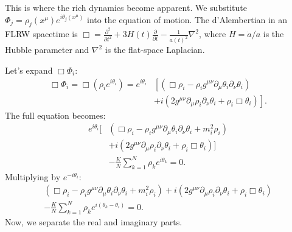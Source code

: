 This is where the rich dynamics become apparent. We substitute $\Phi_j = \rho_j(x^\mu) e^{i\theta_j(x^\mu)}$ into the equation of motion. The d'Alembertian in an FLRW spacetime is $\Box = \frac{\partial^2}{\partial t^2} + 3H(t) \frac{\partial}{\partial t} - \frac{1}{a(t)^2}\nabla^2$, where $H = \dot{a}/a$ is the Hubble parameter and $\nabla^2$ is the flat-space Laplacian.

Let's expand $\Box \Phi_i$:
\begin{equation}
    \begin{aligned}
        \Box \Phi_i = \Box (\rho_i e^{i\theta_i})
        = e^{i\theta_i} &\left[ (\Box \rho_i - \rho_i g^{\mu\nu}\partial_\mu\theta_i \partial_\nu\theta_i) \right. \\
        &\left. + i(2g^{\mu\nu}\partial_\mu\rho_i \partial_\nu\theta_i + \rho_i \Box \theta_i) \right] .
    \end{aligned}
\end{equation}
The full equation becomes:
\begin{equation}
    \begin{aligned}
        e^{i\theta_i} \Big[ &(\Box \rho_i - \rho_i g^{\mu\nu}\partial_\mu\theta_i \partial_\nu\theta_i + m_i^2\rho_i) \\
        &+ i(2g^{\mu\nu}\partial_\mu\rho_i \partial_\nu\theta_i + \rho_i \Box \theta_i) \Big] \\
        &- \frac{K}{N} \sum_{k=1}^N \rho_k e^{i\theta_k} = 0 .
    \end{aligned}
\end{equation}
Multiplying by $e^{-i\theta_i}$:
\begin{multline}
    (\Box \rho_i - \rho_i g^{\mu\nu}\partial_\mu\theta_i \partial_\nu\theta_i + m_i^2\rho_i) + i(2g^{\mu\nu}\partial_\mu\rho_i \partial_\nu\theta_i + \rho_i \Box \theta_i) \\ - \frac{K}{N} \sum_{k=1}^N \rho_k e^{i(\theta_k - \theta_i)} = 0 .
\end{multline}
Now, we separate the real and imaginary parts.

